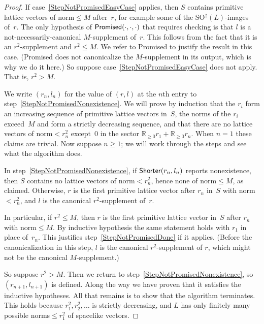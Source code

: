 \documentclass[12pt]{amsart}
\def\R{\mathbb{R}}
\def\SO{\mathrm{SO}}
\def\SOup{\SO^{\uparrow}}
\def\SOup{\mathrm{SO}^{\uparrow}}
\numberwithin{theorem}{section}
\numberwithin{equation}{section}
\numberwithin{figure}{section}
\theoremstyle{remark}
\begin{document}
\begin{proof}
    If case~\ref{StepNotPromisedEasyCase} applies, then $S$ contains primitive lattice
    vectors of norm${}\leq M$ after~$r$, for example some of the
    $\SOup(L)$-images of~$r$.  The only hypothesis of ${\sf Promised}(\cdot,\cdot,\cdot)$
    that requires checking is that $l$ is a not-necessarily-canonical $M$-supplement of~$r$.
    This follows from the fact that it is an $r^2$-supplement and
    $r^2\leq M$.
    We refer to {\sf Promised} to justify the result in this case.
    ({\sf Promised} 
    does not 
    canonicalize
    the $M$-supplement in its output, which is why we do it here.)
    So suppose case~\ref{StepNotPromisedEasyCase} does not apply.  That is, $r^2>M$.

    We write $(r_n,l_n)$ for the value of $(r,l)$ at the $n$th entry
    to  step~\ref{StepNotPromisedNonexistence}.  We will prove by induction that the $r_i$
    form an increasing sequence of primitive lattice vectors
    in~$S$, the norms of the $r_i$
    exceed~$M$ and form a strictly decreasing sequence, and that there
    are no lattice vectors of norm${}< r_n^2$ except~$0$
    in the sector 
    $\R_{\geq0}r_1+\R_{\geq0}r_n$.  When $n=1$ these claims are
    trivial.  Now suppose $n\geq1$; we will work through the steps and
    see what the algorithm does.

    In step~\ref{StepNotPromisedNonexistence}, if ${\sf Shorter}(r_n,l_n)$ reports nonexistence,
    then $S$ contains no lattice vectors of norm${}<r_n^2$, hence none of norm${}\leq M$,
    as claimed.  Otherwise, $r$ is the first primitive lattice vector
    after $r_n$ in~$S$ with norm${}<r_n^2$, and $l$ is the 
    canonical $r^2$-supplement
    of~$r$.  

    In particular, if $r^2\leq M$, then $r$ is the first primitive
    lattice vector in~$S$ after $r_n$ 
    with norm${}\leq M$.  By inductive hypothesis the same statement
    holds with $r_1$ in place of~$r_n$.  This justifies step~\ref{StepNotPromisedDone} if it applies.  
    (Before the canonicalization in this step, 
    $l$ is the canonical $r^2$-supplement of $r$, which might not be
    the canonical $M$-supplement.)

    So suppose $r^2>M$.  Then we return to step~\ref{StepNotPromisedNonexistence},
    so $(r_{n+1},l_{n+1})$ is defined.  Along the way we have
    proven that it satisfies the inductive hypotheses.
    All that remains is to show that the algorithm terminates.
    This holds because 
    $r_1^2,r_2^2,\dots$ is strictly decreasing, and $L$ has only
    finitely many possible norms${}\leq r_1^2$ of spacelike vectors.
\end{proof}
\end{document}
